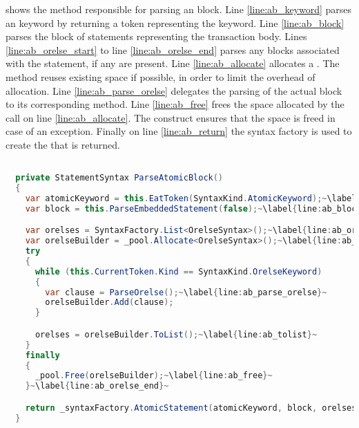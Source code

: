  shows the  method responsible for parsing an  block. Line \ref{line:ab_keyword} parses an  keyword by returning a token representing the keyword. Line \ref{line:ab_block} parses the block of statements representing the transaction body. Lines \ref{line:ab_orelse_start} to line \ref{line:ab_orelse_end} parses any  blocks associated with the  statement, if any are present. Line \ref{line:ab_allocate} allocates a . The  method reuses existing space if possible, in order to limit the overhead of allocation. Line \ref{line:ab_parse_orelse} delegates the parsing of the actual  block to its corresponding method. Line \ref{line:ab_free} frees the space allocated by the call on line \ref{line:ab_allocate}. The  construct ensures that the space is freed in case of an exception. Finally on line \ref{line:ab_return} the syntax factory is used to create the  that is returned.

\begin{lstlisting}[label=lst:parse_atomic_block,
  caption={Method for parsing \bscode{atomic} block},
  language=Java,  
  showspaces=false,
  showtabs=false,
  breaklines=true,
  showstringspaces=false,
  breakatwhitespace=true,
  commentstyle=\color{greencomments},
  keywordstyle=\color{bluekeywords},
  stringstyle=\color{redstrings},
  escapechar=~,
  morekeywords={atomic, retry, orElse, var, get, set}]  % Start your code-block

  private StatementSyntax ParseAtomicBlock()
  { 
    var atomicKeyword = this.EatToken(SyntaxKind.AtomicKeyword);~\label{line:ab_keyword}~
    var block = this.ParseEmbeddedStatement(false);~\label{line:ab_block}~

    var orelses = SyntaxFactory.List<OrelseSyntax>();~\label{line:ab_orelse_start}~
    var orelseBuilder = _pool.Allocate<OrelseSyntax>();~\label{line:ab_allocate}~
    try
    {
      while (this.CurrentToken.Kind == SyntaxKind.OrelseKeyword)
      {
        var clause = ParseOrelse();~\label{line:ab_parse_orelse}~
        orelseBuilder.Add(clause);
      }

      orelses = orelseBuilder.ToList();~\label{line:ab_tolist}~
    }
    finally
    {
      _pool.Free(orelseBuilder);~\label{line:ab_free}~
    }~\label{line:ab_orelse_end}~

    return _syntaxFactory.AtomicStatement(atomicKeyword, block, orelses);~\label{line:ab_return}~
  }
\end{lstlisting}

